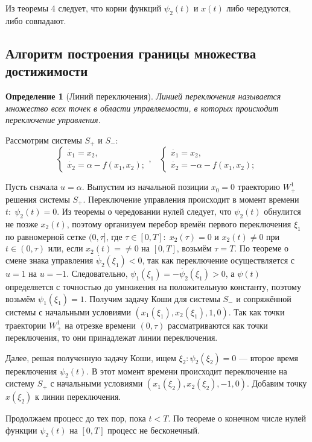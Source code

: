 \documentclass[11pt]{article}
\newtheorem{definition}{Определение}
\begin{document}
Из теоремы 4 следует, что корни функций $\psi_2(t)$ и $x(t)$ либо чередуются, либо совпадают.
\subsection{Алгоритм построения границы множества достижимости}
\begin{definition}[Линий переключения]
Линией переключения называется множество всех точек в области управляемости, в которых происходит переключение управления.
\end{definition}

Рассмотрим системы $S_+$ и $S_-$:
$$
\left\{
\begin{aligned}
\dot{x_1} = x_2, \\
\dot{x_2} = \alpha - f(x_1, x_2);
\end{aligned}
\right., \; \; \;
\left\{
\begin{aligned}
\dot{x_1} = x_2, \\
\dot{x_2} = -\alpha - f(x_1, x_2);
\end{aligned}
\right.
$$

Пусть сначала $u = \alpha$. Выпустим из начальной позиции $x_0 = 0$ траекторию $W_+^1$ решения системы $S_+$. Переключение управления происходит в момент времени $t: \; \psi_2(t) = 0$. Из теоремы о чередовании нулей следует, что $\psi_2(t)$ обнулится не позже $x_2(t)$, поэтому организуем перебор времён первого переключения $\xi_1$ по равномерной сетке $(0, \tau]$, где $\tau \in [0, T]: \; x_2(\tau) = 0$ и $x_2(t) \neq 0$ при $t \in (0, \tau)$ или, если $x_2(t) = \neq 0$ на $[0, T]$, возьмём $\tau = T$. По теореме о смене знака управления $\dot{\psi_2}(\xi_1) < 0$, так как переключение осуществляется с $u = 1$ на $u = -1$. Следовательно, $\psi_1(\xi_1) = -\dot{\psi_2}(\xi_1) > 0$, а $\psi(t)$ определяется с точностью до умножения на положительную константу, поэтому возьмём $\psi_1(\xi_1) = 1$. Получим задачу Коши для системы $S_-$ и сопряжённой системы с начальными условиями $(x_1(\xi_1), x_2(\xi_1), 1, 0)$. Так как точки траектории $W_+^1$ на отрезке времени $(0, \tau)$ рассматриваются как точки переключения, то они принадлежат линии переключения.

Далее, решая полученную задачу Коши, ищем $\xi_2: \psi_2(\xi_2) = 0$ --- второе время переключения $\psi_2(t)$. В этот момент времени происходит переключение на систему $S_+$ с начальными условиями $(x_1(\xi_2), x_2(\xi_2), -1, 0)$. Добавим точку $x(\xi_2)$ к линии переключения.

Продолжаем процесс до тех пор, пока $t < T$. По теореме о конечном числе нулей функции $\psi_2(t)$ на $[0, T]$ процесс не бесконечный.
\end{document}
